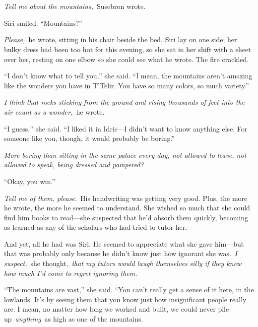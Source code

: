 \chapter{}

\textit{Tell me about the mountains,}~Susebron wrote.

Siri smiled. “Mountains?”

\textit{Please,}~he wrote, sitting in his chair beside the bed. Siri lay on one side; her bulky dress had been too hot for this evening, so she sat in her shift with a sheet over her, resting on one elbow so she could see what he wrote. The fire crackled.

“I don’t know what to tell you,” she said. “I mean, the mountains aren’t amazing like the wonders you have in T’Telir. You have so many colors, so much variety.”

\textit{I think that rocks sticking from the ground and rising thousands of feet into the air count as a wonder,}~he wrote.

“I guess,” she said. “I liked it in Idris—I didn’t want to know anything else. For someone like you, though, it would probably be boring.”

\textit{More boring than sitting in the same palace every day, not allowed to leave, not allowed to speak, being dressed and pampered?}

“Okay, you win.”

\textit{Tell me of them, please.}~His handwriting was getting very good. Plus, the more he wrote, the more he seemed to understand. She wished so much that she could find him books to read—she suspected that he’d absorb them quickly, becoming as learned as any of the scholars who had tried to tutor her.

And yet, all he had was Siri. He seemed to appreciate what she gave him—but that was probably only because he didn’t know just how ignorant she was.~\textit{I suspect,}~she thought,~\textit{that my tutors would laugh themselves silly if they knew how much I’d come to regret ignoring them.}

“The mountains are vast,” she said. “You can’t really get a sense of it here, in the lowlands. It’s by seeing them that you know just how insignificant people really are. I mean, no matter how long we worked and built, we could never pile up~\textit{anything}~as high as one of the mountains.

